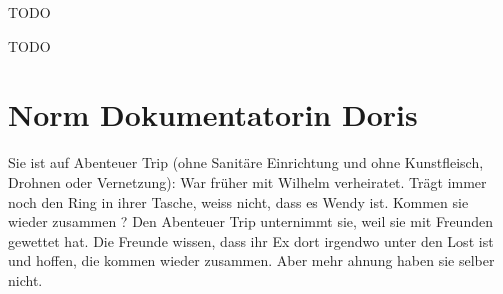 \begin{npcBox}[title=Wendy]
    \begin{consequences}
    \item {}
    \item {}
    \item {}
    \end{consequences}

    \begin{npcDescription}
    TODO
    \end{npcDescription}


    \begin{equipment}
    \item TODO
    \end{equipment}
\end{npcBox}
\newpage

\section{Norm Dokumentatorin Doris}
Sie ist auf Abenteuer Trip (ohne Sanitäre Einrichtung und ohne Kunstfleisch, Drohnen oder Vernetzung): War früher mit Wilhelm verheiratet. Trägt immer noch den Ring in ihrer Tasche, weiss nicht, dass es Wendy ist. Kommen sie wieder zusammen ?
Den Abenteuer Trip unternimmt sie, weil sie mit Freunden gewettet hat. Die Freunde wissen, dass ihr Ex dort irgendwo unter den Lost ist  und hoffen, die kommen wieder zusammen. Aber mehr ahnung haben sie selber nicht.

